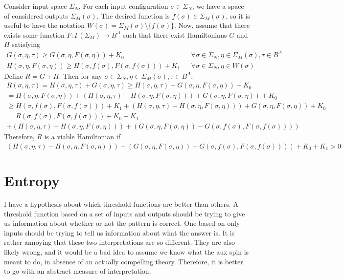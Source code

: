 \documentclass{article}
\begin{document}
Consider input space $\Sigma_N$. For each input configuration $\sigma \in \Sigma_N$, we have a space of considered outputs $\Sigma_M(\sigma)$. The desired function is $f(\sigma) \in \Sigma_M(\sigma)$, so it is useful to have the notation $W(\sigma) = \Sigma_M(\sigma) \setminus \{f(\sigma)\}$. Now, assume that there exists some function $F : \Gamma(\Sigma_M) \longrightarrow B^A$ such that there exist Hamiltonians $G$ and $H$ satisfying
\begin{align}
	G(\sigma, \eta, \tau) \geq G(\sigma, \eta, F(\sigma, \eta)) + K_0 &&\forall \sigma \in \Sigma_N, \eta \in \Sigma_M(\sigma), \tau \in B^A\\
	H(\sigma, \eta, F(\sigma, \eta)) \geq H(\sigma, f(\sigma), F(\sigma, f(\sigma))) + K_1 && \forall \sigma \in \Sigma_N, \eta \in W(\sigma)
\end{align}
Define $R = G + H$. Then for any $\sigma \in \Sigma_N, \eta \in \Sigma_M(\sigma), \tau \in B^A$, 
\begin{align}
	R(\sigma, \eta, \tau) = H(\sigma, \eta, \tau) + G(\sigma, \eta, \tau) \geq H(\sigma, \eta, \tau) + G(\sigma, \eta, F(\sigma, \eta)) + K_0\\
	= H(\sigma, \eta, F(\sigma, \eta)) + (H(\sigma, \eta, \tau) - H(\sigma, \eta, F(\sigma, \eta))) + G(\sigma, \eta, F(\sigma, \eta)) + K_0\\
	\geq H(\sigma, f(\sigma), F(\sigma, f(\sigma))) + K_1 + (H(\sigma, \eta, \tau) - H(\sigma, \eta, F(\sigma, \eta))) + G(\sigma, \eta, F(\sigma, \eta)) + K_0\\
	= R(\sigma, f(\sigma), F(\sigma, f(\sigma))) + K_0 + K_1\\
	+(H(\sigma, \eta, \tau) - H(\sigma, \eta, F(\sigma, \eta))) + (G(\sigma, \eta, F(\sigma, \eta)) - G(\sigma, f(\sigma), F(\sigma, f(\sigma))))
\end{align}
Therefore, $R$ is a viable Hamiltonian if
\begin{align}
	(H(\sigma, \eta, \tau) - H(\sigma, \eta, F(\sigma, \eta))) + (G(\sigma, \eta, F(\sigma, \eta)) - G(\sigma, f(\sigma), F(\sigma, f(\sigma)))) + K_0 + K_1 > 0
\end{align}

\section{Entropy}

I have a hypothesis about which threshold functions are better than others. A threshold function based on a set of inputs and outputs should be trying to give us information about whether or not the pattern is correct. One based on only inputs should be trying to tell us information about what the answer is. It is rather annoying that these two interpretations are so different. They are also likely wrong, and it would be a bad idea to assume we know what the aux spin is meant to do, in absence of an actually compelling theory. Therefore, it is better to go with an abstract measure of interpretation.
\end{document}
